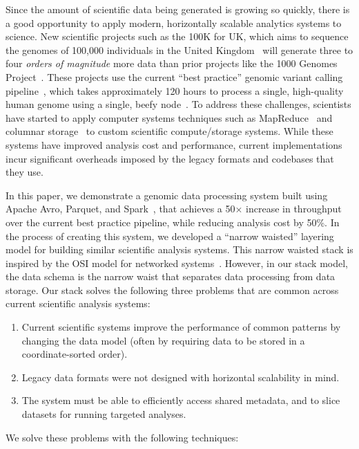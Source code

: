 \documentclass{acm_proc_article-sp}
\begin{document}
Since the amount of scientific data being generated is growing so quickly, there is a good opportunity to apply
modern, horizontally scalable analytics systems to science. New scientific
projects such as the 100K for UK, which aims to sequence the genomes of 100,000 individuals in the
United Kingdom~\cite{uk100k} will generate three to four \emph{orders of magnitude} more data than
prior projects like the 1000 Genomes Project~\cite{siva08}. These projects use the current ``best
practice'' genomic variant calling pipeline~\cite{auwera13}, which takes approximately 120 hours to
process a single, high-quality human genome using a single, beefy node~\cite{talwalkar14}. To address
these challenges, scientists have started to apply computer systems techniques such as
MapReduce~\cite{langmead09, mckenna10, schatz09} and columnar storage~\cite{fritz11} to custom
scientific compute/storage systems. While these systems have improved analysis cost and performance,
current implementations incur significant overheads imposed by the legacy formats and
codebases that they use.

In this paper, we demonstrate a genomic data processing system built using Apache Avro, Parquet, and
Spark~\cite{avro, parquet, zaharia10}, that achieves a 50$\times$ increase in throughput over the current best
practice pipeline, while reducing analysis cost by 50\%. In the process of creating this
system, we developed a ``narrow waisted'' layering model for building similar scientific analysis systems.
This narrow waisted stack is inspired by the OSI model for networked systems~\cite{zimmermann80}.
However, in our stack model, the data schema is the narrow waist that separates data processing from
data storage. Our stack solves the following three problems that are common across current scientific
analysis systems:

\begin{enumerate}
\item Current scientific systems improve the performance of common patterns by changing the data
model (often by requiring data to be stored in a coordinate-sorted order).
\item Legacy data formats were not designed with horizontal scalability in mind.
\item The system must be able to efficiently access shared metadata, and to slice datasets for running
targeted analyses.
\end{enumerate}

We solve these problems with the following techniques:
\end{document}
